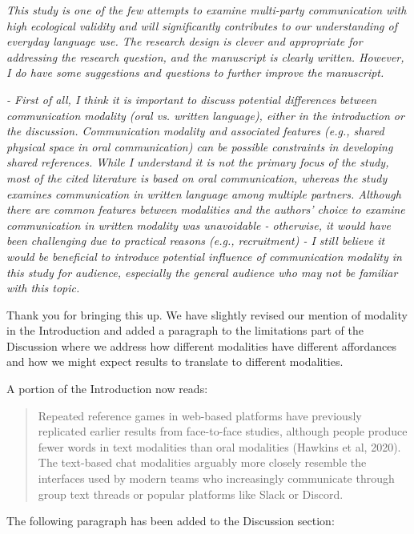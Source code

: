 \documentclass{stanfordletter}
\newcommand{\theysaid}[1]{\begin{leftbar} \noindent 
		\textsl{ #1}\end{leftbar}}
\newcommand{\revised}[1]{\begin{quote}	#1 \end{quote}}
\begin{document}
\begin{letter}{}
          \theysaid{This study is one of the few attempts to examine multi-party communication with high ecological validity and will significantly contributes to our understanding of everyday language use. The research design is clever and appropriate for addressing the research question, and the manuscript is clearly written. However, I do have some suggestions and questions to further improve the manuscript.}
          
          \theysaid{- First of all, I think it is important to discuss potential differences between communication modality (oral vs. written language), either in the introduction or the discussion. Communication modality and associated features (e.g., shared physical space in oral communication) can be possible constraints in developing shared references. While I understand it is not the primary focus of the study, most of the cited literature is based on oral communication, whereas the study examines communication in written language among multiple partners. Although there are common features between modalities and the authors' choice to examine communication in written modality was unavoidable - otherwise, it would have been challenging due to practical reasons (e.g., recruitment) - I still believe it would be beneficial to introduce potential influence of communication modality in this study for audience, especially the general audience who may not be familiar with this topic.}

		Thank you for bringing this up. We have slightly revised our mention of modality in the Introduction and added a paragraph to the limitations part of the Discussion where we address how different modalities have different affordances and how we might expect results to translate to different modalities. 
          
        A portion of the Introduction now reads:
          \revised{Repeated reference games in web-based platforms have previously replicated earlier results from face-to-face studies, although people produce fewer words in text modalities than oral modalities (Hawkins et al, 2020). The text-based chat modalities arguably more closely resemble the interfaces used by modern teams who increasingly communicate through group text threads or popular platforms like Slack or Discord.}
          
The following paragraph has been added to the Discussion section:
          

\end{letter}
\end{document}
